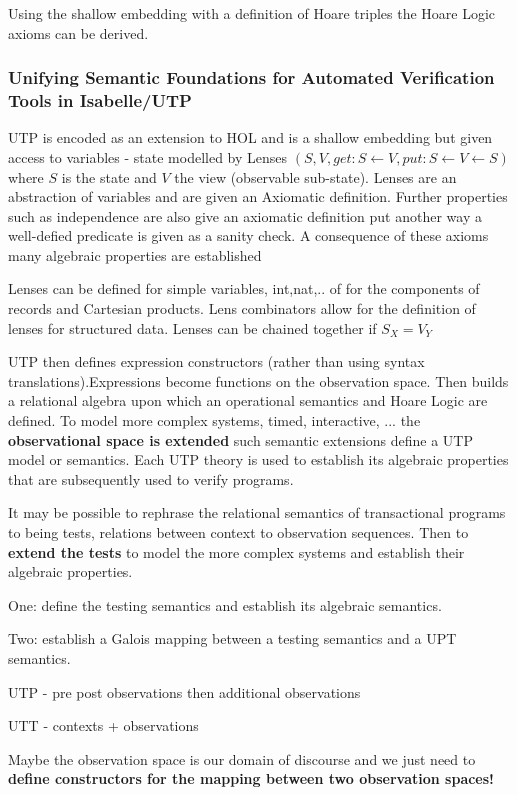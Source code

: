  Using the shallow embedding with a definition of Hoare triples the Hoare Logic axioms can be derived.
  
\subsubsection{Unifying Semantic Foundations for Automated Verification Tools in Isabelle/UTP}
UTP is encoded as an extension to HOL and is a shallow embedding but  given access to variables - state  modelled by Lenses $(S,V,get:S\leftarrow V, put:S\leftarrow V \leftarrow S)$ where $S$ is the state and $V$ the view (observable sub-state). Lenses are an abstraction of variables and are given an Axiomatic definition. Further properties such as independence are also give an axiomatic definition put another way a well-defied predicate is given as a sanity check. A consequence of these axioms many algebraic properties are established 



Lenses can be defined for simple variables, int,nat,.. of for the components of records and Cartesian products.
Lens combinators allow for the definition of lenses for structured data. 
 Lenses can be chained together if $S_X=V_Y$



UTP then defines expression constructors (rather than using syntax translations).Expressions become functions on the observation space. Then builds a relational algebra upon which an operational semantics and Hoare Logic are defined.
To model more complex systems, timed, interactive, ... the {\bf observational space is extended} such semantic extensions define a   UTP model or semantics. Each UTP theory is used to establish its algebraic properties  that are subsequently used to verify programs.

It may be possible to rephrase the relational semantics of transactional programs  to being tests, relations between context to observation sequences. Then to {\bf extend the tests} to model the more complex systems and establish their algebraic properties.

One: define the testing semantics and establish its algebraic semantics. 

Two: establish a Galois mapping between a testing semantics and a UPT semantics. 


UTP -  pre post observations then additional observations

UTT - contexts + observations

Maybe the observation space is our domain of discourse and we just need to {\bf define constructors for the mapping between two observation spaces!}







